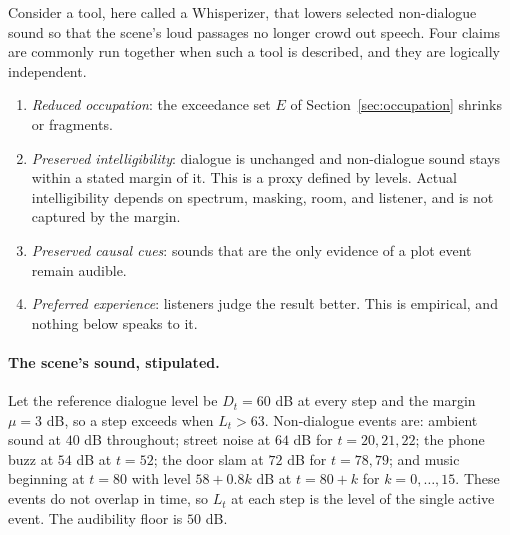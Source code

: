 Consider a tool, here called a Whisperizer, that lowers selected non-dialogue sound so that the scene's loud passages no longer crowd out speech. Four claims are commonly run together when such a tool is described, and they are logically independent.
\begin{enumerate}
\item \emph{Reduced occupation}: the exceedance set $E$ of Section~\ref{sec:occupation} shrinks or fragments.
\item \emph{Preserved intelligibility}: dialogue is unchanged and non-dialogue sound stays within a stated margin of it. This is a proxy defined by levels. Actual intelligibility depends on spectrum, masking, room, and listener, and is not captured by the margin.
\item \emph{Preserved causal cues}: sounds that are the only evidence of a plot event remain audible.
\item \emph{Preferred experience}: listeners judge the result better. This is empirical, and nothing below speaks to it.
\end{enumerate}

\paragraph{The scene's sound, stipulated.} Let the reference dialogue level be $D_t=60$ dB at every step and the margin $\mu=3$ dB, so a step exceeds when $L_t>63$. Non-dialogue events are: ambient sound at $40$ dB throughout; street noise at $64$ dB for $t=20,21,22$; the phone buzz at $54$ dB at $t=52$; the door slam at $72$ dB for $t=78,79$; and music beginning at $t=80$ with level $58+0.8k$ dB at $t=80+k$ for $k=0,\dots,15$. These events do not overlap in time, so $L_t$ at each step is the level of the single active event. The audibility floor is $50$ dB.

